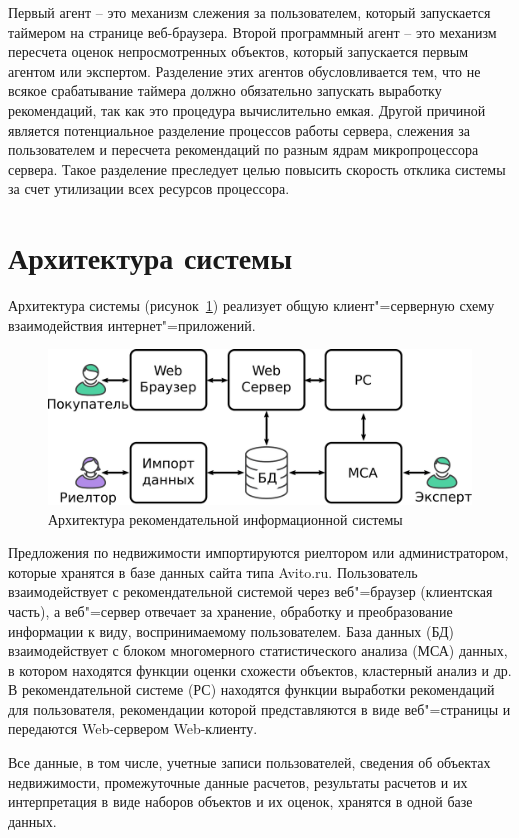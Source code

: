 \documentclass[a4paper,14pt,openany,final]{extreport} %
\begin{document}
Первый агент -- это механизм слежения за пользователем, который запускается таймером на странице веб-браузера. Второй программный агент -- это механизм пересчета оценок непросмотренных объектов, который запускается первым агентом или экспертом. Разделение этих агентов обусловливается тем, что не всякое срабатывание таймера должно обязательно запускать выработку рекомендаций, так как это процедура вычислительно емкая.  Другой причиной является потенциальное разделение процессов работы сервера, слежения за пользователем и пересчета рекомендаций по разным ядрам микропроцессора сервера. Такое разделение преследует целью повысить скорость отклика системы за счет утилизации всех ресурсов процессора.

\section{Архитектура системы}
Архитектура системы (рисунок~\ref{fig:architecture}) реализует общую клиент"=серверную схему взаимодействия интернет"=приложений.
\begin{figure}[htbp]
  \centering
  \includegraphics[width=0.7\linewidth]{architecture.pdf}
  \caption{Архитектура рекомендательной информационной системы}
  \label{fig:architecture}
\end{figure}

Предложения по недвижимости импортируются риелтором или администратором, которые хранятся в базе данных сайта типа Avito.ru. Пользователь взаимодействует с рекомендательной системой через веб"=браузер (клиентская часть), а веб"=сервер отвечает за хранение, обработку и преобразование информации к виду, воспринимаемому пользователем. База данных (БД) взаимодействует с блоком многомерного статистического анализа (МСА) данных, в котором находятся функции оценки схожести объектов, кластерный анализ и др. В рекомендательной системе (РС) находятся функции выработки рекомендаций для пользователя, рекомендации которой представляются в виде веб"=страницы и передаются Web-сервером Web-клиенту.

Все данные, в том числе, учетные записи пользователей, сведения об объектах недвижимости, промежуточные данные расчетов, результаты расчетов и их интерпретация в виде наборов объектов и их оценок, хранятся в одной базе данных.
\end{document}
